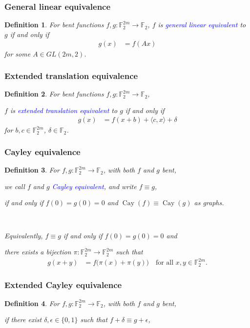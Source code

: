 \documentclass[pdf,sprung,slideColor,nocolorBG]{beamer}
\newenvironment{colortheme}[1]{
\def\ProvidesPackageRCS $##1${\relax}
\renewcommand{\ProcessOptions}{\relax}
\makeatletter

\makeatother
}{}
\newcommand{\mb}[1]{\mathbb{#1}}
\newcommand{\Emph}[1]{\emph{\textcolor{blue}{#1}}}
\newcommand{\To}{\rightarrow}
\newcommand{\Cay}[1]{\operatorname{Cay}\left(#1\right)}
\newcommand{\F}{\mb{F}}
\newtheorem{Def}{Definition}
\begin{document}
\begin{colortheme}{access}

\begin{frame}
\frametitle{General linear equivalence}

\begin{Def}
For bent functions $f,g : \F_2^{2m} \To \F_2$,
$f$ is \Emph{general linear equivalent} to $g$ if and only if
\begin{align*}
g(x) &= f(A x)
\end{align*}
for some $A \in GL(2m,2)$.
\end{Def}
\end{frame}
\begin{frame}
\frametitle{Extended translation equivalence}

\begin{Def}
For bent functions $f,g : \F_2^{2m} \To \F_2$,

$f$ is \Emph{extended translation equivalent} to $g$ if and only if
\begin{align*}
g(x) &= f(x + b) + \langle c, x \rangle + \delta
\end{align*}
for $b, c \in \F_2^{2m}$, $\delta \in \F_2$.
\end{Def}
\end{frame}

\begin{frame}
\frametitle{Cayley equivalence}
\begin{Def}
%
For $f, g : \F_2^{2m} \To \F_2$, with both $f$ and $g$ bent,

we call $f$ and $g$ \Emph{Cayley equivalent},
and write $f \equiv g$,

if and only if $f(0)=g(0)=0$ and $\Cay{f} \equiv \Cay{g}$ as graphs.

~

Equivalently, $f \equiv g$ if and only if $f(0)=g(0)=0$ and

there exists a bijection $\pi : \F_2^{2m} \To \F_2^{2m}$ such that
\begin{align*}
g(x+y) &= f \big(\pi(x)+\pi(y)\big) \quad \text{for all~} x,y \in \F_2^{2m}.
\end{align*}
\end{Def}
\end{frame}
\begin{frame}
\frametitle{Extended Cayley equivalence}
\begin{Def}
For $f, g : \F_2^{2m} \To \F_2$, with both $f$ and $g$ bent,

if there exist $\delta, \epsilon \in \{0,1\}$ such that $f + \delta \equiv g + \epsilon$,


\end{Def}
\end{frame}
\end{colortheme}
\end{document}
